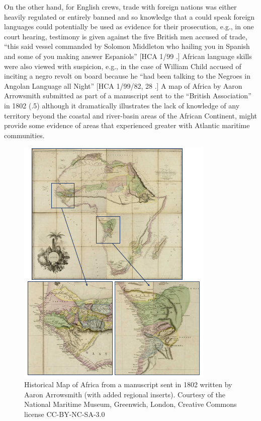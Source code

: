   On the other hand, for English crews, trade with foreign nations was either heavily regulated or entirely banned and so knowledge that a  could speak foreign languages could potentially be used as evidence for their prosecution, e.g., in one court hearing, testimony is given against the five British men accused of  trade, “this said vessel commanded by Solomon Middleton who hailing you in Spanish and some of you making answer Espaniols” [HCA 1/99  \citealt{Islands1722}.] African language skills were also viewed with suspicion, e.g., in the case of William Child accused of inciting a negro revolt on board because he “had been talking to the Negroes in Angolan Language all Night” [HCA 1/99/82, 28 \citealt{March1722}.] A map of Africa by Aaron Arrowsmith submitted as part of a manuscript sent to the “British Association” in 1802 (.5) although it dramatically illustrates the lack of knowledge of any territory beyond the coastal and river-basin areas of the African Continent, might provide some evidence of areas that experienced greater  with Atlantic maritime communities. 

\begin{figure}
 

\includegraphics[width=\textwidth]{figures/delgado-img5.png}

\caption{\label{fig:key:3.5} Historical Map of Africa from a manuscript sent in 1802 written by Aaron Arrowsmith (with added regional inserts). Courtesy of the National Maritime Museum, Greenwich, London, Creative Commons license CC-BY-NC-SA-3.0}
\end{figure}

